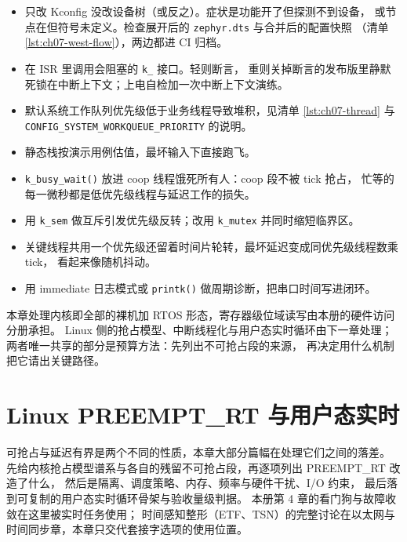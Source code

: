 \documentclass[12pt,a4paper,fontset=fandol]{ctexbook}
\newcommand{\Fn}[1]{\texttt{#1()}}
\newcommand{\Tp}[1]{\texttt{#1}}
\newcommand{\Bk}{\discretionary{}{}{}}
\begin{document}
\begin{itemize}
  \item 只改 Kconfig 没改设备树（或反之）。症状是功能开了但探测不到设备，
        或节点在但符号未定义。检查展开后的 \Tp{zephyr.dts} 与合并后的配置快照
        （清单 \ref{lst:ch07-west-flow}），两边都进 CI 归档。
  \item 在 ISR 里调用会阻塞的 \Tp{k\_} 接口。轻则断言，
        重则关掉断言的发布版里静默死锁在中断上下文；上电自检加一次中断上下文演练。
  \item 默认系统工作队列优先级低于业务线程导致堆积，见清单 \ref{lst:ch07-thread}
        与 \Tp{CONFIG\_{\Bk}SYSTEM\_{\Bk}WORKQUEUE\_{\Bk}PRIORITY} 的说明。
  \item 静态栈按演示用例估值，最坏输入下直接跑飞。
  \item \Fn{k\_busy\_wait} 放进 coop 线程饿死所有人：coop 段不被 tick 抢占，
        忙等的每一微秒都是低优先级线程与延迟工作的损失。
  \item 用 \Tp{k\_sem} 做互斥引发优先级反转；改用 \Tp{k\_mutex} 并同时缩短临界区。
  \item 关键线程共用一个优先级还留着时间片轮转，最坏延迟变成同优先级线程数乘 tick，
        看起来像随机抖动。
  \item 用 immediate 日志模式或 \Fn{printk} 做周期诊断，把串口时间写进闭环。
\end{itemize}

\begin{note}[title={本册内的分界与外部参考}]
本章处理内核即全部的裸机加 RTOS 形态，寄存器级位域读写由本册的硬件访问分册承担。
Linux 侧的抢占模型、中断线程化与用户态实时循环由下一章处理；
两者唯一共享的部分是预算方法：先列出不可抢占段的来源，
再决定用什么机制把它请出关键路径。
\end{note}

\chapter{Linux PREEMPT\_RT 与用户态实时}
\label{ch:ch08-linux-rt}

可抢占与延迟有界是两个不同的性质，本章大部分篇幅在处理它们之间的落差。
先给内核抢占模型谱系与各自的残留不可抢占段，再逐项列出 PREEMPT\_RT 改造了什么，
然后是隔离、调度策略、内存、频率与硬件干扰、I/O 约束，
最后落到可复制的用户态实时循环骨架与验收量级判据。
本册第 4 章的看门狗与故障收敛在这里被实时任务使用；
时间感知整形（ETF、TSN）的完整讨论在以太网与时间同步章，本章只交代套接字选项的使用位置。
\end{document}
